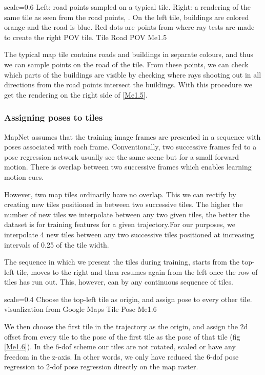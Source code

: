 {scale=0.6}%
{Left: road points sampled on a typical tile. Right: a rendering of the same tile as seen from the road points,  \cite{newman2017}. On the left tile, buildings are colored orange and the road is blue. Red dots are points from where ray tests are made to create the right POV tile.}%
{Tile Road POV}%
{Me1.5}

The typical map tile contains roads and buildings in separate colours, and thus we can sample points on the road of the tile. From these points, we can check which parts of the buildings are visible by checking where rays shooting out in all directions from the road points intersect the buildings. With this procedure we get the rendering on the right side of \ref{Me1.5}. 

\subsubsection{Assigning poses to tiles}
MapNet assumes that the training image frames are presented in a sequence with poses associated with each frame. Conventionally, two successive frames fed to a pose regression network usually see the same scene but for a small forward motion. There is overlap between two successive frames which enables learning motion cues. 

However, two map tiles ordinarily have no overlap. This we can rectify by creating new tiles positioned in between two successive tiles. The higher the number of new tiles we interpolate between any two given tiles, the better the dataset is for training features for a given trajectory.For our purposes, we interpolate 4 new tiles between any two successive tiles positioned at increasing intervals of 0.25 of the tile width. 

The sequence in which we present the tiles during training, starts from the top-left tile, moves to the right and then resumes again from the left once the row of tiles has run out. This, however, can by any continuous sequence of tiles.

{scale=0.4}%
{Choose the top-left tile as origin, and assign pose to every other tile. visualization from Google Maps}%
{Tile Pose}%
{Me1.6}

We then choose the first tile in the trajectory as the origin, and assign the 2d offset from every tile to the pose of the first tile as the pose of that tile (fig \ref{Me1.6}). In the 6-dof scheme our tiles are not rotated, scaled or have any freedom in the z-axis. In other words, we only have reduced the 6-dof pose regression to 2-dof pose regression directly on the map raster. 

